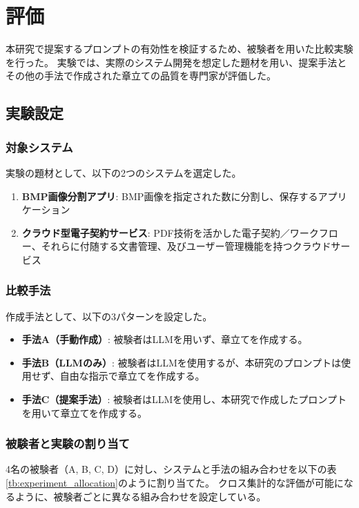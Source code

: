 \chapter{評価}\label{cha:Evaluation}

本研究で提案するプロンプトの有効性を検証するため、被験者を用いた比較実験を行った。
実験では、実際のシステム開発を想定した題材を用い、提案手法とその他の手法で作成された章立ての品質を専門家が評価した。

\section{実験設定}

\subsection{対象システム}
実験の題材として、以下の2つのシステムを選定した。
\begin{enumerate}
    \item \textbf{BMP画像分割アプリ}: BMP画像を指定された数に分割し、保存するアプリケーション
    \item \textbf{クラウド型電子契約サービス}: PDF技術を活かした電子契約／ワークフロー、それらに付随する文書管理、及びユーザー管理機能を持つクラウドサービス
\end{enumerate}

\subsection{比較手法}
作成手法として、以下の3パターンを設定した。
\begin{itemize}
    \item \textbf{手法A（手動作成）}: 被験者はLLMを用いず、章立てを作成する。
    \item \textbf{手法B（LLMのみ）}: 被験者はLLMを使用するが、本研究のプロンプトは使用せず、自由な指示で章立てを作成する。
    \item \textbf{手法C（提案手法）}: 被験者はLLMを使用し、本研究で作成したプロンプトを用いて章立てを作成する。
\end{itemize}

\subsection{被験者と実験の割り当て}
4名の被験者（A, B, C, D）に対し、システムと手法の組み合わせを以下の表\ref{tb:experiment_allocation}のように割り当てた。
クロス集計的な評価が可能になるように、被験者ごとに異なる組み合わせを設定している。

